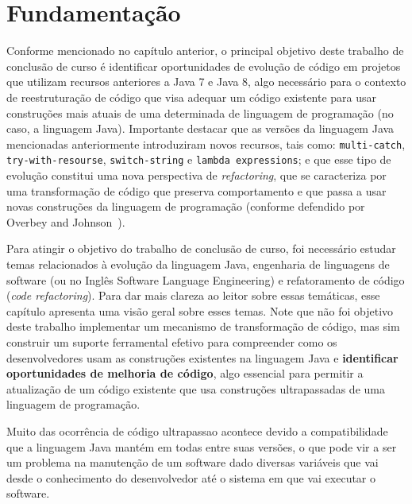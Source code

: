 %
%
\chapter{Fundamenta\c{c}\~{a}o}

Conforme mencionado no cap\'{i}tulo anterior, o principal objetivo deste trabalho de conclus\~{a}o de curso \'{e} 
identificar oportunidades de evolu\c{c}\~{a}o de c\'{o}digo em projetos que utilizam recursos anteriores a Java 7 e Java 8, 
algo necess\'{a}rio para o contexto de reestrutura\c c\~{a}o de c\'{o}digo que visa adequar um c\'{o}digo 
existente para usar constru\c c\~{o}es mais atuais de uma determinada de linguagem de programa\c c\~{a}o 
(no caso, a linguagem Java). Importante destacar que as vers\~{o}es da linguagem Java mencionadas anteriormente
introduziram novos recursos, tais como: \texttt{multi-catch}, \texttt{try-with-resourse}, \texttt{switch-string} 
e \texttt{lambda expressions}; e que esse tipo de evolu\c{c}\~{a}o constitui uma nova perspectiva de \textit{refactoring}, que se caracteriza 
por uma transforma\c c\~{a}o de c\'{o}digo que preserva comportamento e que passa a usar  
novas constru\c c\~{o}es da linguagem de programa\c c\~{a}o (conforme defendido por Overbey and Johnson~\cite{Overbey:2009}). 

Para atingir o objetivo do trabalho de conclus\~{a}o de curso, foi necess\'{a}rio estudar temas relacionados 
\`{a} evolu\c c\~{a}o da linguagem Java, engenharia de linguagens de software (ou no Ingl\^{e}s Software 
Language Engineering) e refatoramento de c\'{o}digo (\emph{code refactoring}).  Para dar mais clareza ao leitor 
sobre essas tem\'{a}ticas, esse cap\'{i}tulo apresenta uma vis\~{a}o geral sobre esses temas. Note que n\~{a}o foi objetivo
deste trabalho implementar um mecanismo de transforma\c c\~{a}o de c\'{o}digo, mas sim construir um suporte ferramental 
efetivo para compreender como os desenvolvedores usam as constru\c c\~{o}es existentes na linguagem Java e {\bf identificar oportunidades de melhoria de c\'{o}digo}, algo essencial para permitir a atualiza\c c\~{a}o de um c\'{o}digo existente que usa constru\c c\~{o}es ultrapassadas de uma linguagem de programa\c c\~{a}o. 
 
Muito das ocorr\^{e}ncia de c\'{o}digo ultrapassao acontece devido a compatibilidade que a linguagem Java mant\'{e}m em todas entre suas vers\~{o}es, o que pode vir a ser um problema na manuten\c{c}\~{a}o de um software dado diversas vari\'{a}veis que vai desde o conhecimento do desenvolvedor at\'{e} o sistema em que vai executar o software.
 
